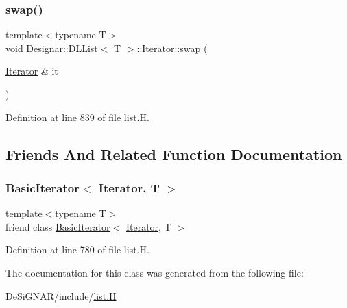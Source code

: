 \mbox{\label{class_designar_1_1_d_l_list_1_1_iterator_afb6abdec64f67b81813441a4c7d133d1}} 
\subsubsection{\texorpdfstring{swap()}{swap()}}
{\footnotesize\ttfamily template$<$typename T$>$ \\
void \hyperlink{class_designar_1_1_d_l_list}{Designar\+::\+D\+L\+List}$<$ T $>$\+::Iterator\+::swap (\begin{DoxyParamCaption}\item[{\hyperlink{class_designar_1_1_d_l_list_1_1_iterator}{Iterator} \&}]{it }\end{DoxyParamCaption})\hspace{0.3cm}{\ttfamily [inline]}}



Definition at line 839 of file list.\+H.



\subsection{Friends And Related Function Documentation}
\mbox{\label{class_designar_1_1_d_l_list_1_1_iterator_ae3421d6be56b523bf3c41ceb29f3e5d7}} 
\subsubsection{\texorpdfstring{Basic\+Iterator$<$ Iterator, T $>$}{BasicIterator< Iterator, T >}}
{\footnotesize\ttfamily template$<$typename T$>$ \\
friend class \hyperlink{class_designar_1_1_basic_iterator}{Basic\+Iterator}$<$ \hyperlink{class_designar_1_1_d_l_list_1_1_iterator}{Iterator}, T $>$\hspace{0.3cm}{\ttfamily [friend]}}



Definition at line 780 of file list.\+H.



The documentation for this class was generated from the following file\+:\begin{DoxyCompactItemize}
\item 
De\+Si\+G\+N\+A\+R/include/\hyperlink{list_8_h}{list.\+H}\end{DoxyCompactItemize}
